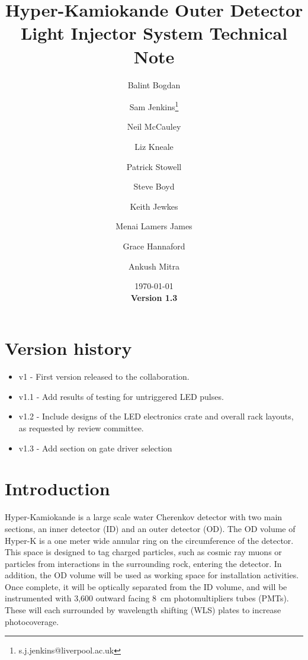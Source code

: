 \documentclass[a4paper,11pt]{article}
\begin{document}
\title{Hyper-Kamiokande Outer Detector Light Injector System Technical Note}
\author[1]{Balint Bogdan}
\author[1]{Sam Jenkins\footnote{s.j.jenkins@liverpool.ac.uk}}
\author[1]{Neil McCauley}
\author[2]{Liz Kneale}
\author[2]{Patrick Stowell}
\author[3]{Steve Boyd}
\author[3]{Keith Jewkes}
\author[3]{Menai Lamers James}
\author[3]{Grace Hannaford}
\author[3]{Ankush Mitra}

\date{\today\\
{\bf Version 1.3}}

\maketitle

\tableofcontents

\newpage

\section{Version history}
\begin{itemize}
\item v1 - First version released to the collaboration.
\item v1.1 - Add results of testing for untriggered LED pulses.
\item v1.2 - Include designs of the LED electronics crate and overall rack layouts, as requested by review committee.
\item v1.3 - Add section on gate driver selection
\end{itemize}

\newpage

\section{Introduction}
\label{sec:intro}

Hyper-Kamiokande is a large scale water Cherenkov detector with two main sections, an inner detector (ID) and an outer detector (OD). The OD volume of Hyper-K is a one meter wide annular ring on the circumference of the detector. This space is designed to tag charged particles, such as cosmic ray muons or particles from interactions in the surrounding rock, entering the detector. In addition, the OD volume will be used as working space for installation activities. Once complete, it will be optically separated from the ID volume, and will be instrumented with 3,600 outward facing 8~cm photomultipliers tubes (PMTs). These will each surrounded by wavelength shifting (WLS) plates to increase photocoverage.
\end{document}
